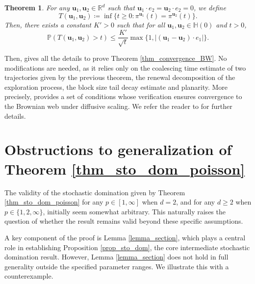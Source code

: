 \documentclass[a4paper, 11pt]{article}
\theoremstyle{plain}
\newtheorem{Theorem}{Theorem}[section]
\theoremstyle{definition}
\newcommand{\R}{\mathbb{R}}
\renewcommand{\P}{\mathbb{P}}
\numberwithin{equation}{section}
\begin{document}
\begin{Theorem}
    For any $\mathbf u_1,\mathbf u_2\in\R^d$ such that $\mathbf u_1\cdot e_2=\mathbf u_2\cdot e_2=0$, we define
        \[T(\mathbf u_1,\mathbf u_2)\coloneqq\inf\{t\geq 0:\pi^{\mathbf u_1}(t)=\pi^{\mathbf u_2}(t)\}.\]
    Then, there exists a constant $K'>0$ such that for all $\mathbf u_1,\mathbf u_2\in\mathbb H(0)$ and $t>0$,
        \[\P(T(\mathbf u_1,\mathbf u_2)>t)\leq\frac{K'}{\sqrt t}\max\{1, |(\mathbf u_1-\mathbf u_2)\cdot e_1|\}.\]
\end{Theorem}


Then, \cite[Section 6]{Dsf2d} gives all the details to prove Theorem \ref{thm_convergence_BW}. No modifications are needed, as it relies only on the coalescing time estimate of two trajectories given by the previous theorem, the renewal decomposition of the exploration process, the block size tail decay estimate and planarity. More precisely, \cite[Theorem 6.3]{Dsf2d} provides a set of conditions whose verification ensures convergence to the Brownian web under diffusive scaling. We refer the reader to \cite{Dsf2d} for further details.

\appendix

\section{Obstructions to generalization of Theorem \ref{thm_sto_dom_poisson}}

\label{section_counter_example}

The validity of the stochastic domination given by Theorem \ref{thm_sto_dom_poisson} for any $p\in[1, \infty]$ when $d=2$, and for any $d\geq 2$ when $p\in\{1, 2, \infty\}$, initially seem somewhat arbitrary. This naturally raises the question of whether the result remains valid beyond these specific assumptions.

A key component of the proof is Lemma \ref{lemma_section}, which plays a central role in establishing Proposition \ref{prop_sto_dom}, the core intermediate stochastic domination result. However, Lemma \ref{lemma_section} does not hold in full generality outside the specified parameter ranges. We illustrate this with a counterexample.
\end{document}

